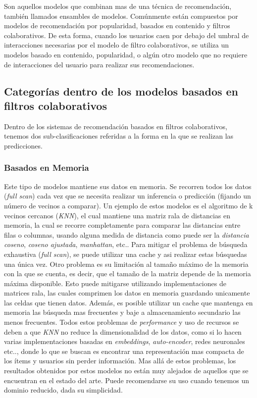 \documentclass[11pt,a4paper,twoside]{thesis}
\begin{document}
Son aquellos modelos que combinan mas de una técnica de recomendación, también
llamados ensambles de modelos. Comúnmente están compuestos por modelos de
recomendación por popularidad, basados en contenido y filtros colaborativos. De
esta forma, cuando los usuarios caen por debajo del umbral de interacciones
necesarias por el modelo de filtro colaborativos, se utiliza un modelos basado
en contenido, popularidad, o algún otro modelo que no requiere de interacciones
del usuario para realizar sus recomendaciones.

\subsection{Categorías dentro de los modelos basados en filtros colaborativos}

Dentro de los sistemas de recomendación basados en filtros colaborativos,
tenemos dos sub-clasificaciones referidas a la forma en la que se realizan las
predicciones.

\subsubsection{Basados en Memoria}

Este tipo de modelos mantiene sus datos en memoria. Se recorren todos los datos
(\textit{full scan}) cada vez que se necesita realizar un inferencia o
predicción (fijando un número de vecinos a comparar). Un ejemplo de estos
modelos es el algoritmo de k vecinos cercanos (\textit{KNN}), el cual mantiene
una matriz rala de distancias en memoria, la cual se recorre completamente para
comparar las distancias entre filas o columnas, usando alguna medida de
distancia como puede ser la \textit{distancia coseno}, \textit{coseno
	ajustada}, \textit{manhattan}, etc.. Para mitigar el problema de búsqueda
exhaustiva (\textit{full scan}), se puede utilizar una cache y asi realizar
estas búsquedas una única vez. Otro problema es su limitación al tamaño máximo
de la memoria con la que se cuenta, es decir, que el tamaño de la matriz
depende de la memoria máxima disponible. Esto puede mitigarse utilizando
implementaciones de matrices rala, las cuales comprimen los datos en
memoria guardando unicamente las celdas que tienen datos. Además, es posible
utilizar un cache que mantenga en memoria las búsqueda mas frecuentes y baje a
almacenamiento secundario las menos frecuentes. Todos estos problemas de
\textit{performance} y uso de recursos se deben a que \textit{KNN} no reduce la
dimensionalidad de los datos, como si lo hacen varias implementaciones basadas
en \textit{embeddings}, \textit{auto-encoder}, redes neuronales etc.., donde lo
que se buscan es encontrar una representación mas compacta de los ítems y
usuarios sin perder información. Mas allá de estos problemas, los resultados
obtenidos por estos modelos no están muy alejados de aquellos que se encuentran
en el estado del arte. Puede recomendarse su uso cuando tenemos un dominio
reducido, dada su simplicidad.
\end{document}
